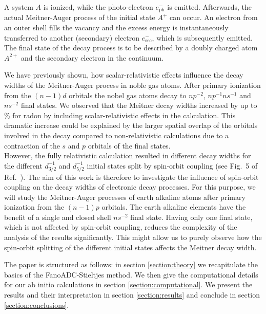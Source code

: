 \documentclass[aps,amssymb,preprint,a4paper]{revtex4}
\begin{document}
A system $A$ is ionized, while the photo-electron $e^-_\text{ph}$ is emitted.      
Afterwards, the actual Meitner-Auger
process of the initial state $A^+$ can occur.    
An electron from an outer                                       
shell fills the vacancy and the excess energy is instantaneously transferred  
to another (secondary) electron $e^-_\text{sec}$, which
is subsequently emitted. The final state of the decay process   
is to be described by a doubly charged atom $A^{2+}$ and the secondary        
electron in the continuum.

We have previously shown, how
scalar-relativistic effects influence the decay widths of the Meitner-Auger
process in
noble gas atoms. \cite{Fasshauer15_1}
After primary ionization from the $(n-1)d$ orbitals the nobel
gas atoms decay to $np^{-2}$, $np^{-1}ns^{-1}$ and $ns^{-2}$ final states.
We observed that the Meitner decay widths increased by up to \unit[326]{\%}
for radon
by including scalar-relativistic effects in the calculation. This
dramatic increase could be explained by the larger spatial
overlap of the orbitals
involved in the decay compared to non-relativistic calculations due to
a contraction of the $s$ and $p$ orbitals of the final states.\\
However, the fully relativistic calculation resulted in different decay widths
for the different $d_{3/2}^{-1}$ and $d_{5/2}^{-1}$ initial states split by
spin-orbit coupling (see Fig.~5 of Ref.~\cite{Fasshauer15_1}).
The aim of this work is therefore to investigate the
influence of spin-orbit coupling on the decay widths of electronic decay processes.
For this purpose, we will study the Meitner-Auger processes of earth alkaline atoms
after primary ionization from the $(n-1)p$ orbitals. The earth alkaline elements
have the benefit of a single and closed shell $ns^{-2}$ final state.
Having only one final state, which is not affected by spin-orbit coupling,
reduces the complexity of the analysis of the results significantly.
This might allow us to purely observe how the spin-orbit splitting of
the different initial states affects the Meitner decay width.

The paper is structured as follows:
in section \ref{section:theory} we recapitulate the basics of the
FanoADC-Stieltjes method. We then give the computational details for our
ab initio calculations in section \ref{section:computational}. We present the
results and their interpretation in section \ref{section:results}
and conclude in section \ref{section:conclusions}.
\end{document}
